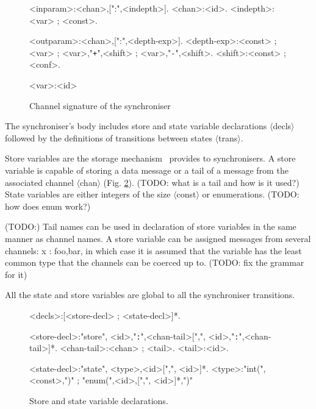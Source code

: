 \begin{figure}[h!]
\small
\begin{grammar}
<inparam>:<chan>,[":",<indepth>].
<chan>:<id>.
<indepth>:<var> ; <const>.

<outparam>:<chan>,[":",<depth-exp>].
<depth-exp>:<const> ; <var> ; <var>,"{\tt+}",<shift> ; <var>,"{\tt -}",<shift>.
<shift>:<const> ; <conf>.

<var>:<id>
\end{grammar}
\caption{Channel signature of the synchroniser}
\label{sync_syntax:params}
\end{figure}

The synchroniser's body includes store and state variable declarations $\langle$decls$\rangle$ followed by the definitions of transitions between states $\langle$trans$\rangle$.

Store variables are the storage mechanism \ak\ provides to synchronisers. A store variable is capable of storing a data message or a tail of a message from the associated channel $\langle$chan$\rangle$ (Fig. \ref{sync_syntax:decls}). (TODO: what is a tail and how is it used?) State variables are either integers of the size $\langle$const$\rangle$ or enumerations. (TODO: how does enum work?)

(TODO:) Tail names can be used in declaration of store variables in the same manner as channel names. A store variable can be assigned messages from several channels: x : foo,bar, in which case it is assumed that the variable has the least common type that the channels can be coerced up to. (TODO: fix the grammar for it)

All the state and store variables are global to all the synchroniser transitions.

\begin{figure}[h!]
\small
\begin{grammar}
<decls>:[<store-decl> ; <state-decl>]*.

<store-decl>:"store", <id>,"{\tt :}",<chan-tail>[",", <id>,"{\tt :}",<chan-tail>]*.
<chan-tail>:<chan> ; <tail>.
<tail>:<id>.

<state-decl>:"state", <type>,<id>[",", <id>]*.
<type>:"int(",<const>,")" ; "enum(",<id>,[",", <id>]*,")"
\end{grammar}
\caption{Store and state variable declarations.}
\label{sync_syntax:decls}
\end{figure}

